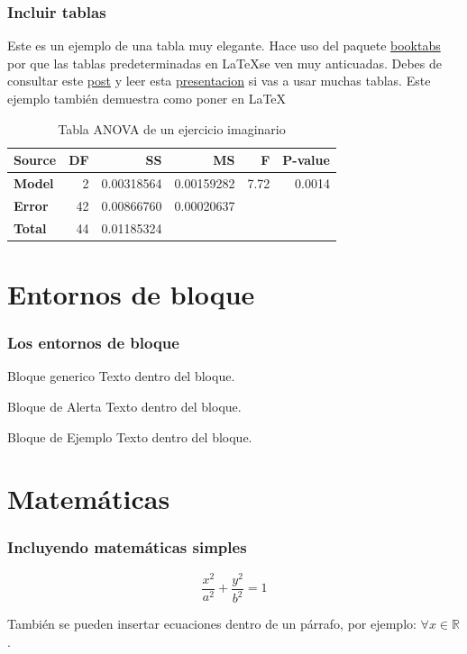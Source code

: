 \documentclass{beamer}
\begin{document}
\begin{frame}
\frametitle{Incluir tablas}
Este es un ejemplo de una tabla muy elegante.
Hace uso del paquete \href{https://ctan.org/pkg/booktabs}{booktabs} por que las tablas predeterminadas en \LaTeX se ven muy anticuadas.
Debes de consultar este \href{https://jdhao.github.io/2019/08/27/latex_table_with_booktabs/}{post} y leer esta \href{https://people.inf.ethz.ch/markusp/teaching/guides/guide-tables.pdf}{presentacion} si vas a usar muchas tablas.
Este ejemplo también demuestra como poner  en \LaTeX{}
\begin{table}[htb]
  \begin{center}
    \begin{tabular}{l | r r r r r}
      \toprule
      Source & \textbf{DF} & \textbf{SS} & \textbf{MS} & \textbf{F} & \textbf{P-value} \\
      \midrule
      \textbf{Model} & 2 & 0.00318564 & 0.00159282 & 7.72 & 0.0014 \\
      \textbf{Error} & 42 & 0.00866760 & 0.00020637 &  & \\
      \midrule
      \textbf{Total} & 44 & 0.01185324 &   &  & \\
      \bottomrule
    \end{tabular}
  \end{center}
\caption{Tabla ANOVA de un ejercicio imaginario}
\end{table}
\end{frame}

\section{Entornos de bloque}
\begin{frame}
\frametitle{Los entornos de bloque}
    \begin{block}{Bloque generico}
        Texto dentro del bloque.
    \end{block}

    \begin{alertblock}{Bloque de Alerta}
        Texto dentro del bloque.
    \end{alertblock}

    \begin{exampleblock}{Bloque de Ejemplo}
        Texto dentro del bloque.
    \end{exampleblock}   
\end{frame}

\section{Matemáticas}
\begin{frame}
\frametitle{Incluyendo matemáticas simples}
 \begin{equation}
 \label{eq:elipse}
 \frac{x^{2}}{a^{2}} + \frac{y^{2}}{b^{2}} = 1
 \end{equation}
 
  También se pueden insertar ecuaciones dentro de un párrafo, por ejemplo: $\forall x \in \mathbb{R}$.
\end{frame}
\end{document}
